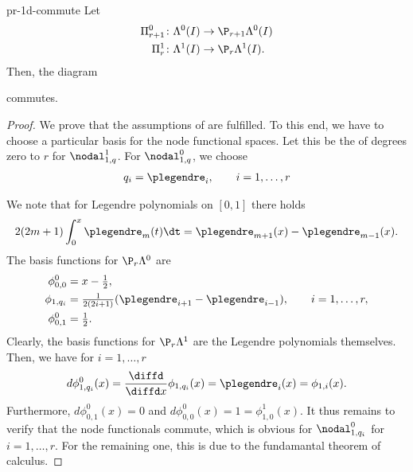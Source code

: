 \begin{Lemma}{pr-1d-commute}
  Let
  \begin{gather}
    \begin{split}
      \Pi^0_{r+1}\colon \Lambda^0(I) &\to \P_{r+1}\Lambda^0(I)\\
      \Pi^1_{r}\colon \Lambda^1(I) &\to \P_{r}\Lambda^1(I).
    \end{split}
  \end{gather}
 Then, the diagram
  \begin{center}
  \end{center}
  commutes.
\end{Lemma}

\begin{proof}
  We prove that the assumptions of  are
  fulfilled. To this end, we have to choose a particular basis for the
  node functional spaces. Let this be the  of degrees zero to $r$ for $\nodal_{1,q}^1$. For
  $\nodal_{1,q}^0$, we choose
  \begin{gather}
    q_i = \plegendre_i,\qquad i=1,\dots, r
  \end{gather}

  We note that for Legendre polynomials on $[0,1]$ there holds
  \begin{gather}
    2(2m+1) \int_0^x \plegendre_m(t)\dt = \plegendre_{m+1}(x) - \plegendre_{m-1}(x).
  \end{gather}
  The basis functions for $\P_r\Lambda^0$ are
  \begin{gather}
    \begin{split}
      \phi_{0,0}^0 &= x-\tfrac12,\\
      \phi_{1,q_i} &= \tfrac{1}{2(2i+1)}(\plegendre_{i+1} - \plegendre_{i-1}),
      \qquad i=1,\dots,r,\\
      \phi_{0,1}^0 &= \tfrac12.
    \end{split}
  \end{gather}
  Clearly, the basis functions for $\P_r\Lambda^1$ are the Legendre polynomials themselves.
  Then, we have for $i=1,\dots,r$
  \begin{gather}
    d \phi_{1,q_i}^0(x) = \frac{\diffd}{\diffd x} \phi_{1,q_i}(x)
    = \plegendre_i(x)
    = \phi_{1,i}(x).
  \end{gather}
  Furthermore, $d\phi_{0,1}^0(x)=0$ and
  $d\phi_{0,0}^0(x)=1 = \phi_{1,0}^1(x)$. It thus remains to verify
  that the node functionals commute, which is obvious for
  $\nodal_{1,q_i}^0$ for $i=1,\dots,r$. For the remaining one, this
  is due to the fundamantal theorem of calculus.
\end{proof}

